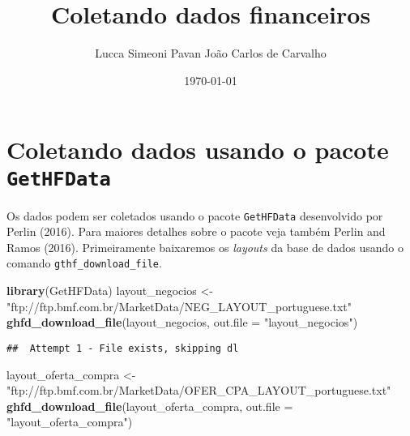 \documentclass[]{article}
\title{Coletando dados financeiros}
\author{Lucca Simeoni Pavan \hspace{1cm} João Carlos de Carvalho}
\date{\today}
\newenvironment{Shaded}{\begin{snugshade}}{\end{snugshade}}
\newcommand{\KeywordTok}[1]{\textcolor[rgb]{0.13,0.29,0.53}{\textbf{{#1}}}}
\newcommand{\DataTypeTok}[1]{\textcolor[rgb]{0.13,0.29,0.53}{{#1}}}
\newcommand{\DecValTok}[1]{\textcolor[rgb]{0.00,0.00,0.81}{{#1}}}
\newcommand{\StringTok}[1]{\textcolor[rgb]{0.31,0.60,0.02}{{#1}}}
\newcommand{\OtherTok}[1]{\textcolor[rgb]{0.56,0.35,0.01}{{#1}}}
\newcommand{\NormalTok}[1]{{#1}}
\begin{document}
\maketitle

{
\setcounter{tocdepth}{2}
\tableofcontents
}
\begin{Shaded}
\end{Shaded}

\section{\texorpdfstring{Coletando dados usando o pacote
\texttt{GetHFData}}{Coletando dados usando o pacote GetHFData}}\label{coletando-dados-usando-o-pacote-gethfdata}

Os dados podem ser coletados usando o pacote \texttt{GetHFData}
desenvolvido por Perlin (2016). Para maiores detalhes sobre o pacote
veja também Perlin and Ramos (2016). Primeiramente baixaremos os
\emph{layouts} da base de dados usando o comando
\texttt{gthf\_download\_file}.

\begin{Shaded}
\begin{Highlighting}[]
\KeywordTok{library}\NormalTok{(GetHFData)}
\NormalTok{layout_negocios <-}\StringTok{ "ftp://ftp.bmf.com.br/MarketData/NEG_LAYOUT_portuguese.txt"}
\KeywordTok{ghfd_download_file}\NormalTok{(layout_negocios, }\DataTypeTok{out.file =} \StringTok{"layout_negocios"}\NormalTok{)}
\end{Highlighting}
\end{Shaded}

\begin{verbatim}
##  Attempt 1 - File exists, skipping dl
\end{verbatim}

\begin{Shaded}
\begin{Highlighting}[]
\NormalTok{layout_oferta_compra <-}\StringTok{ "ftp://ftp.bmf.com.br/MarketData/OFER_CPA_LAYOUT_portuguese.txt"}
\KeywordTok{ghfd_download_file}\NormalTok{(layout_oferta_compra, }\DataTypeTok{out.file =} \StringTok{"layout_oferta_compra"}\NormalTok{)}
\end{Highlighting}
\end{Shaded}
\end{document}
